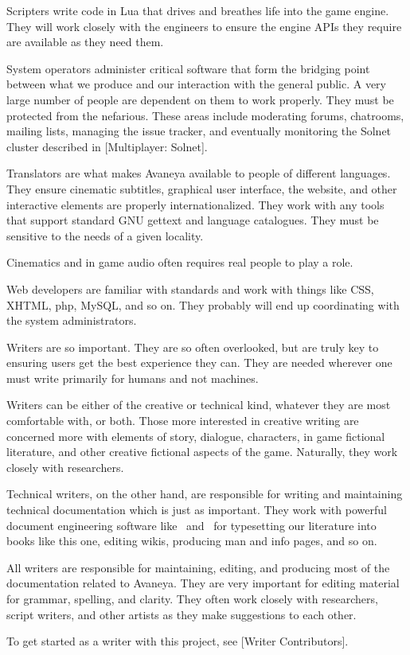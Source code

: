 
Scripters write code in Lua that drives and breathes life into the game engine. They will work closely with the engineers to ensure the engine APIs they require are available as they need them.


System operators administer critical software that form the bridging point between what we produce and our interaction with the general public. A very large number of people are dependent on them to work properly. They must be protected from the nefarious. These areas include moderating forums, chatrooms, mailing lists, managing the issue tracker, and eventually monitoring the Solnet cluster described in [Multiplayer: Solnet].


Translators are what makes Avaneya available to people of different languages. They ensure cinematic subtitles, graphical user interface, the website, and other interactive elements are properly internationalized. They work with any tools that support standard GNU gettext and language catalogues. They must be sensitive to the needs of a given locality.


Cinematics and in game audio often requires real people to play a role.


Web developers are familiar with standards and work with things like CSS, XHTML, php, MySQL, and so on. They probably will end up coordinating with the system administrators.


Writers are so important. They are so often overlooked, but are truly key to ensuring users get the best experience they can. They are needed wherever one must write primarily for humans and not machines.

Writers can be either of the creative or technical kind, whatever they are most comfortable with, or both. Those more interested in creative writing are concerned more with elements of story, dialogue, characters, in game fictional literature, and other creative fictional aspects of the game. Naturally, they work closely with researchers.

Technical writers, on the other hand, are responsible for writing and maintaining technical documentation which is just as important. They work with powerful document engineering software like \BIBTEX\ and \CONTEXT\ for typesetting our literature into books like this one, editing wikis, producing man and info pages, and so on.

All writers are responsible for maintaining, editing, and producing most of the documentation related to Avaneya. They are very important for editing material for grammar, spelling, and clarity. They often work closely with researchers, script writers, and other artists as they make suggestions to each other. 

To get started as a writer with this project, see [Writer Contributors].

\StopChapter
